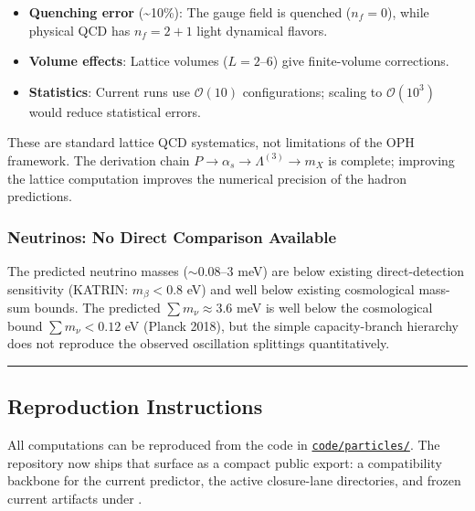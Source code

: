 \begin{itemize}
\tightlist
\item
  \textbf{Quenching error} (\textasciitilde10\%): The gauge field is quenched (\(n_f = 0\)), while physical QCD has \(n_f = 2+1\) light dynamical flavors.
\item
  \textbf{Volume effects}: Lattice volumes (\(L = 2\)--\(6\)) give finite-volume corrections.
\item
  \textbf{Statistics}: Current runs use \(\mathcal{O}(10)\) configurations; scaling to \(\mathcal{O}(10^3)\) would reduce statistical errors.
\end{itemize}

These are standard lattice QCD systematics, not limitations of the OPH framework. The derivation chain \(P \to \alpha_s \to \Lambda^{(3)} \to m_X\) is complete; improving the lattice computation improves the numerical precision of the hadron predictions.

\subsubsection{Neutrinos: No Direct Comparison Available}\label{115-neutrinos-no-direct-comparison-available}

The predicted neutrino masses (\(\sim 0.08\)--\(3\) meV) are below existing direct-detection sensitivity (KATRIN: \(m_\beta < 0.8\) eV) and well below existing cosmological mass-sum bounds. The predicted \(\sum m_\nu \approx 3.6\) meV is well below the cosmological bound \(\sum m_\nu < 0.12\) eV (Planck 2018), but the simple capacity-branch hierarchy does not reproduce the observed oscillation splittings quantitatively.

\begin{center}\rule{0.5\linewidth}{0.5pt}\end{center}

\subsection{Reproduction Instructions}\label{12-reproduction-instructions}

All computations can be reproduced from the code in \href{../code/particles/}{\texttt{code/particles/}}.
The repository now ships that surface as a compact public export: a
 compatibility backbone for the current predictor,
the active closure-lane directories, and frozen current artifacts under
.

